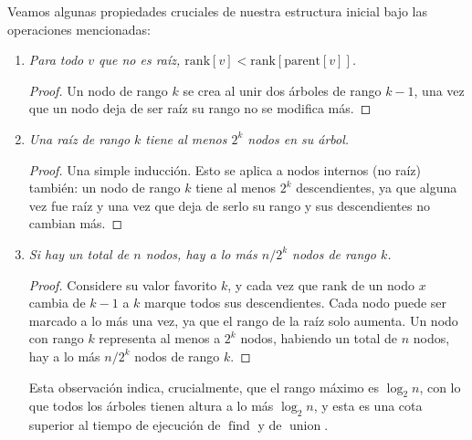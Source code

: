   Veamos algunas propiedades cruciales de nuestra estructura inicial
  bajo las operaciones mencionadas:
  \begin{enumerate}[label = {\textbf{Propiedad \arabic*:}},
                    ref = \arabic*,
                    leftmargin = *,
                    itemindent = 4em]
  \item
    \label{prop:ufs-1}
    \emph{Para todo \(v\) que no es raíz,
          \(\mathrm{rank}[v]
               < \mathrm{rank}[\mathrm{parent}[v]]\).}

    \begin{proof}
      Un nodo de rango \(k\) se crea al unir dos árboles de rango \(k - 1\),
      una vez que un nodo deja de ser raíz su rango no se modifica más.
    \end{proof}
  \item
    \label{prop:ufs-2}
    \emph{Una raíz de rango \(k\) tiene al menos \(2^k\) nodos en su árbol.}

    \begin{proof}
      Una simple inducción.
      Esto se aplica a nodos internos
      (no raíz)
      también:
      un nodo de rango \(k\) tiene al menos \(2^k\) descendientes,
      ya que alguna vez fue raíz
      y una vez que deja de serlo su rango y sus descendientes no cambian más.
    \end{proof}
  \item
    \label{prop:ufs-3}
    \emph{Si hay un total de \(n\) nodos,
          hay a lo más \(n / 2^k\) nodos de rango \(k\).}

    \begin{proof}
      Considere su valor favorito \(k\),
      y cada vez que \(\mathrm{rank}\)
      de un nodo \(x\)
      cambia de \(k - 1\) a \(k\) marque todos sus descendientes.
      Cada nodo puede ser marcado a lo más una vez,
      ya que el rango de la raíz solo aumenta.
      Un nodo con rango \(k\)
      representa al menos a \(2^k\) nodos,
      habiendo un total de \(n\) nodos,
      hay a lo más \(n / 2^k\) nodos de rango \(k\).
    \end{proof}
    Esta observación indica,
    crucialmente,
    que el rango máximo es \(\log_2 n\),
    con lo que todos los árboles tienen altura a lo más \(\log_2 n\),
    y esta es una cota superior
    al tiempo de ejecución de \(\operatorname{find}\)
    y de \(\operatorname{union}\).
  \end{enumerate}

